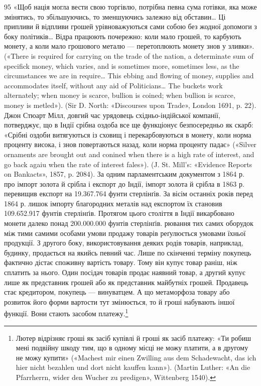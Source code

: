 95 «Щоб нація могла вести свою торгівлю, потрібна певна сума
готівки, яка може змінятись, то збільшуючись, то зменшуючись залежно
від обставин\dots{} Ці припливи й відпливи грошей урівноважуються
сами собою без жодної допомоги з боку політиків\dots{} Відра працюють почережно:
коли мало грошей, то карбують монету, а коли мало грошового
металю — перетоплюють монету знов у зливки». («There is required for
carrying on the trade of the nation, a determinate sum of specifick money,
which varies, and is sometimes more, sometimes less, as the circumstances
we are in require\dots{} This ebbing and flowing of money, supplies and accommodates
itself, without any aid of Politicians\dots{} The buckets work alternately;
when money is scarce, bullion is coined; when bullion is scarce, money
is metled»). (Sir D. North: «Discourses upon Trade», London 1691, p. 22).
Джон Стюарт Мілл, довгий час урядовець східньо-індійської компанії,
потверджує, що в Індії срібна оздоба все ще функціонує безпосередньо як
скарб: «Срібні оздоби витягуються із сховищ і перекарбовуються в монету,
коли норма проценту висока, і знов повертаються назад, коли норма проценту
падає» («Silver ornaments are brought out and conined when there
is a high rate of interest, and go back agaiu when the rate of interest fales»).
(J. St. Mill’s: «Evidence Reports on Bankacts», 1857, p. 2084). За одним
парламентським документом з 1864 р. про імпорт золота й срібла і експорт
до Індії, імпорт золота й срібла в 1863 р. перевищив експорт на 19.367.764
фунти стерлінґів. За вісім останніх років перед 1864 р. лишок імпорту
благородних металів над експортом їх становив 109.652.917 фунтів стерлінґів.
Протягом цього століття в Індії викарбовано монети далеко понад
200.000.000 фунтів стерлінґів.
рювання тих самих оборудок між тими самими особами умови продажу товарів реґулюється умовами їхньої
продукції. З другого боку, використовування деяких родів товарів, наприклад, будинку, продається на
якийсь певний час. Лише по скінченні терміну покупець фактично дістає споживну вартість товару. Тому
він купує товар раніш, ніж сплатить за нього. Один посідач товарів продає наявний товар, а другий
купує лише як представник грошей або як представник майбутніх грошей. Продавець стає кредитором,
покупець — винуватцем. А що метаморфоза товару або розвиток його форми вартости тут змінюється, то й
гроші набувають іншої функції. Вони стають засобом платежу.\footnote{
Лютер відрізняє гроші як засіб купівлі й гроші як засіб платежу:
«Ти робиш мені подвійну шкоду тим, що в одному місці не можу платити,
а в другому не можу купити» («Machest mir einen Zwilling aus dem Schadewacht,
das ich hier nicht bezahlen und dort nicht kauffen kann»). (Martin Luther:
«An die Pfarrherrn, wider den Wucher zu predigen», Wittenberg 1540).
}

